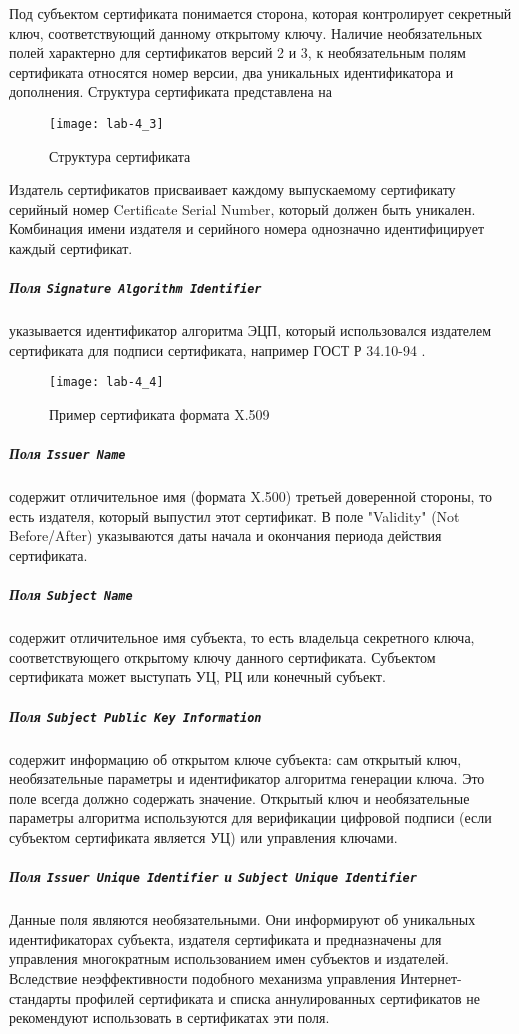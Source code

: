 Под субъектом сертификата понимается сторона, которая контролирует секретный
ключ, соответствующий данному открытому ключу. Наличие необязательных полей
характерно для сертификатов версий 2 и 3, к необязательным полям сертификата
относятся номер версии, два уникальных идентификатора и дополнения. Структура
сертификата представлена на 

\begin{figure}[h]
  \centering
  \texttt{[image: lab-4\_3]}
  \caption{Структура сертификата}\label{lab4_3}
\end{figure}

Издатель сертификатов присваивает каждому выпускаемому сертификату серийный
номер Certificate Serial Number, который должен быть уникален. Комбинация
имени издателя и серийного номера однозначно идентифицирует каждый
сертификат.

\subparagraph{\textmd{Поля} \texttt{Signature Аlgorithm Identifier}}
указывается идентификатор алгоритма ЭЦП, который использовался издателем
сертификата для подписи сертификата, например ГОСТ Р 34.10-94 .

\begin{figure}[h]
  \centering
  \texttt{[image: lab-4\_4]}
  \caption{Пример сертификата формата X.509}\label{lab4_4}
\end{figure}
 \subparagraph{\textmd{Поля} \texttt{Issuer Name}} содержит отличительное имя
(формата X.500) третьей доверенной стороны, то есть издателя, который
выпустил этот сертификат. В поле "Validity" (Not Before/After) указываются
даты начала и окончания периода действия сертификата.

\subparagraph{\textmd{Поля} \texttt{Subject Name}} содержит отличительное имя
субъекта, то есть владельца секретного ключа, соответствующего открытому
ключу данного сертификата. Субъектом сертификата может выступать УЦ, РЦ или
конечный субъект.

\subparagraph{\textmd{Поля} \texttt{Subject Public Key Information}} содержит
информацию об открытом ключе субъекта: сам открытый ключ, необязательные
параметры и идентификатор алгоритма генерации ключа. Это поле всегда должно
содержать значение. Открытый ключ и необязательные параметры алгоритма
используются для верификации цифровой подписи (если субъектом сертификата
является УЦ) или управления ключами.

\subparagraph{\textmd{Поля} \texttt{Issuer Unique Identifier} \textmd{и}
\texttt{Subject Unique Identifier}} Данные поля являются необязательными. Они
информируют об уникальных идентификаторах субъекта, издателя сертификата и
предназначены для управления многократным использованием имен субъектов и
издателей. Вследствие неэффективности подобного механизма управления
Интернет-стандарты профилей сертификата и списка аннулированных сертификатов
не рекомендуют использовать в сертификатах эти поля.

